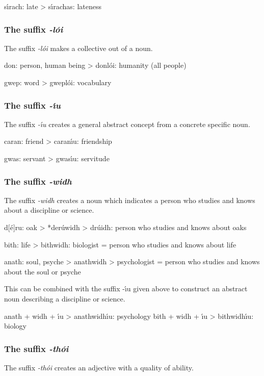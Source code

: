 s\'{\i}rach: late
> s\'{\i}rachas: lateness

\subsubsection{The suffix \textit{-l\'{o}i}}

The suffix \textit{-l\'{o}i} makes a collective out of a noun.

don: person, human being
> donl\'{o}i: humanity (all people)

gwep: word
> gwepl\'{o}i: vocabulary

\subsubsection{The suffix \textit{-\'{\i}u}}

The suffix \textit{-\'{\i}u} creates a general abstract concept from a concrete specific noun.

caran: friend
> caran\'{\i}u: friendship

gwas: servant
> gwas\'{\i}u: servitude

\subsubsection{The suffix \textit{-widh}}

The suffix \textit{-widh} creates a noun which indicates a person who studies and knows about a discipline or science.

d[\'{e}]ru: oak
> *der\'{u}widh > dr\'{u}idh: person who studies and knows about oaks

bith: life
> bithwidh: biologist = person who studies and knows about life
 
anath: soul, psyche
> anathwidh > psychologist = person who studies and knows about the soul or psyche

This can be combined with the suffix -\'{\i}u given above to construct an abstract noun describing a discipline or science.

anath + widh + \'{\i}u > anathwidh\'{\i}u: psychology
bith + widh + \'{\i}u > bithwidh\'{\i}u: biology

\subsubsection{The suffix \textit{-th\'{o}i}}

The suffix \textit{-th\'{o}i} creates an adjective with a quality of ability.


